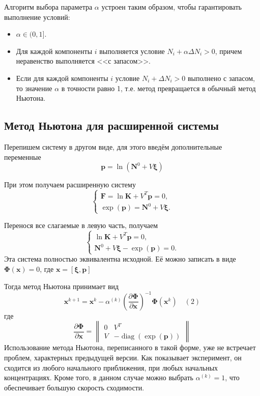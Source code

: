 \documentclass[14pt,a4paper]{extarticle}
\newcommand{\pd}[2]{\frac{\partial #1}{\partial #2}}
\newcommand{\diag}{\operatorname{diag}}
\renewcommand{\vec}[1]{\boldsymbol{\mathbf{#1}}}
\begin{document}
Алгоритм выбора параметра $\alpha$ устроен таким образом, чтобы гарантировать выполнение условий:
\begin{itemize}
\item $\alpha \in (0, 1]$.
\item Для каждой компоненты $i$ выполняется условие $N_i + \alpha \Delta N_i > 0$, причем неравенство выполняется <<с запасом>>.
\item Если для каждой компоненты $i$ условие $N_i + \Delta N_i > 0$ выполнено с запасом, то значение $\alpha$ в точности равно 1, т.е. метод превращается в обычный метод Ньютона.
\end{itemize}

\subsection{Метод Ньютона для расширенной системы}

Перепишем систему в другом виде, для этого введём дополнительные переменные $$\vec{p} = \ln{(\vec{N}^0 + V\vec{\xi})}$$ 

При этом получаем расширенную систему
$$\begin{cases} 
	\vec{F} = \ln{\vec{K}} + V^T\vec{p}=0,\\
	\exp(\vec{p})=\vec{N}^0 + V\vec{\xi}.
	
\end{cases}$$

Перенося все слагаемые в левую часть, получаем
$$\begin{cases} 
	\ln{\vec{K}} + V^T\vec{p}=0,\\
	\vec{N}^0 + V\vec{\xi} - \exp(\vec{p}) = 0.
\end{cases}$$
Эта система полностью эквивалентна исходной. Её можно записать в виде
$\vec{\Phi}(\vec{x}) = 0$, где $ \vec{x} = [\vec{\xi}, \vec{p}]$

Тогда метод Ньютона принимает вид\\
$$\vec{x}^{k+1} = \vec{x}^{k} - \alpha^{(k)}\left(\pd{\vec{\Phi}}{\vec{x}}\right)^{-1}\vec{\Phi}(\vec x^k) \quad (2)$$
 где $$\pd{\vec{\Phi}}{\vec{x}} = \begin{Vmatrix}
 0 & V^T \\
 V & -\diag({\exp(\vec{p})})
\end{Vmatrix}  $$
Использование метода Ньютона, переписанного в такой форме, уже не встречает проблем, характерных предыдущей версии. Как показывает эксперимент, он сходится из любого начального приближения, при любых начальных концентрациях. Кроме того, в данном случае можно выбрать $\alpha^{(k)} = 1$, что обеспечивает большую скорость сходимости.
\end{document}
